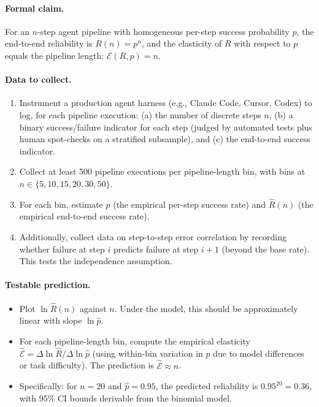 \paragraph{Formal claim.} For an $n$-step agent pipeline with homogeneous per-step success probability $p$, the end-to-end reliability is $R(n) = p^n$, and the elasticity of $R$ with respect to $p$ equals the pipeline length: $\mathcal{E}(R,p) = n$.

\paragraph{Data to collect.}
\begin{enumerate}[nosep]
    \item Instrument a production agent harness (e.g., Claude Code, Cursor, Codex) to log, for each pipeline execution: (a) the number of discrete steps $n$, (b) a binary success/failure indicator for each step (judged by automated tests plus human spot-checks on a stratified subsample), and (c) the end-to-end success indicator.
    \item Collect at least 500 pipeline executions per pipeline-length bin, with bins at $n \in \{5, 10, 15, 20, 30, 50\}$.
    \item For each bin, estimate $\hat{p}$ (the empirical per-step success rate) and $\hat{R}(n)$ (the empirical end-to-end success rate).
    \item Additionally, collect data on step-to-step error correlation by recording whether failure at step $i$ predicts failure at step $i+1$ (beyond the base rate). This tests the independence assumption.
\end{enumerate}

\paragraph{Testable prediction.}
\begin{itemize}[nosep]
    \item Plot $\ln \hat{R}(n)$ against $n$. Under the model, this should be approximately linear with slope $\ln \hat{p}$.
    \item For each pipeline-length bin, compute the empirical elasticity $\hat{\mathcal{E}} = \Delta \ln \hat{R} / \Delta \ln \hat{p}$ (using within-bin variation in $p$ due to model differences or task difficulty). The prediction is $\hat{\mathcal{E}} \approx n$.
    \item Specifically: for $n = 20$ and $\hat{p} = 0.95$, the predicted reliability is $0.95^{20} = 0.36$, with 95\% CI bounds derivable from the binomial model.
\end{itemize}

